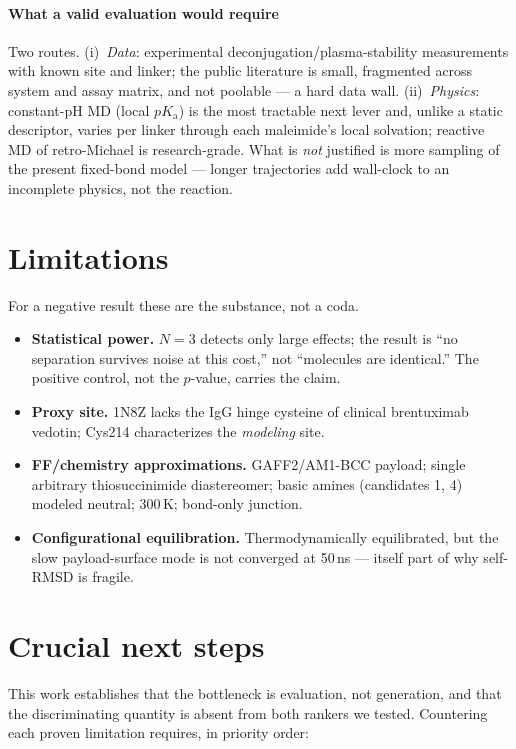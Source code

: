 \documentclass[10pt,twocolumn]{article}
\begin{document}
\paragraph{What a valid evaluation would require}
Two routes. (i)~\emph{Data}: experimental deconjugation/plasma-stability measurements with known site and
linker; the public literature is small, fragmented across system and assay matrix, and not poolable ---
a hard data wall. (ii)~\emph{Physics}: constant-pH MD (local $pK_\mathrm{a}$) is the most tractable next
lever and, unlike a static descriptor, varies per linker through each maleimide's local solvation;
reactive MD of retro-Michael is research-grade. What is \emph{not} justified is more sampling of the
present fixed-bond model --- longer trajectories add wall-clock to an incomplete physics, not the
reaction.

\section{Limitations}
For a negative result these are the substance, not a coda.
\begin{itemize}[leftmargin=1.1em,itemsep=1pt,topsep=2pt]
\item \textbf{Statistical power.} $N{=}3$ detects only large effects; the result is ``no separation
survives noise at this cost,'' not ``molecules are identical.'' The positive control, not the $p$-value,
carries the claim.
\item \textbf{Proxy site.} 1N8Z lacks the IgG hinge cysteine of clinical brentuximab vedotin; Cys214
characterizes the \emph{modeling} site.
\item \textbf{FF/chemistry approximations.} GAFF2/AM1-BCC payload; single arbitrary thiosuccinimide
diastereomer; basic amines (candidates 1, 4) modeled neutral; 300\,K; bond-only junction.
\item \textbf{Configurational equilibration.} Thermodynamically equilibrated, but the slow
payload-surface mode is not converged at 50\,ns --- itself part of why self-RMSD is fragile.
\end{itemize}

\section{Crucial next steps}
This work establishes that the bottleneck is evaluation, not generation, and that the discriminating
quantity is absent from both rankers we tested. Countering each proven limitation requires, in priority
order:
\end{document}
